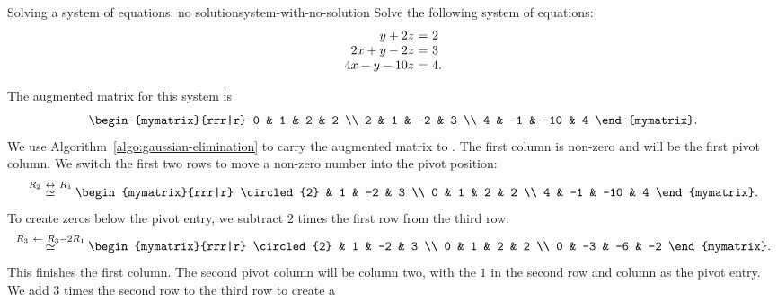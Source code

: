 \begin{example}{Solving a system of equations: no solution}{system-with-no-solution}
  Solve the following system of equations:
  \begin{equation*}
    \begin{array}{r@{~}c@{~}l}
      y + 2z &=& 2 \\
      2x + y - 2z &=& 3 \\
      4x - y - 10z &=& 4.
    \end{array}
  \end{equation*}
\end{example}

\begin{solution} The augmented matrix for this system is
  \begin{equation*}
    \begin{mymatrix}{rrr|r}
      0 &  1 &   2 & 2 \\
      2 &  1 &  -2 & 3 \\
      4 & -1 & -10 & 4
    \end{mymatrix}.
  \end{equation*}
  We use Algorithm~\ref{algo:gaussian-elimination} to carry the
  augmented matrix to {\ef}. The first column is non-zero and will be the
  first pivot column. We switch the first two rows to move a non-zero
  number into the pivot position:
  \begin{equation*}
    \stackrel{R_2\rowswap R_1}{\roweq}
    \begin{mymatrix}{rrr|r}
      \circled{2} &  1 &  -2 & 3 \\
      0 &  1 &   2 & 2 \\
      4 & -1 & -10 & 4
    \end{mymatrix}.
  \end{equation*}
  To create zeros below the pivot entry, we subtract $2$ times the
  first row from the third row:
  \begin{equation*}
    \stackrel{R_3\rowop R_3-2R_1}{\roweq}
    \begin{mymatrix}{rrr|r}
      \circled{2} &  1 &  -2 & 3 \\
      0 &  1 &   2 & 2 \\
      0 & -3 & -6 & -2
    \end{mymatrix}.
  \end{equation*}
  This finishes the first column. The second pivot column will be
  column two, with the $1$ in the second row and column as the pivot
  entry. We add $3$ times the second row to the third row to create a

\end{solution}
